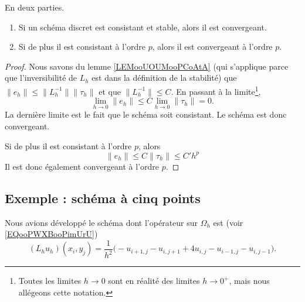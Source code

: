 \begin{theorem}     \label{THOooEPQQooUQMcgF}
    En deux parties.
    \begin{enumerate}
        \item
            Si un schéma discret est consistant et stable, alors il est convergeant. 
        \item
            Si de plus il est consistant à l'ordre \( p\), alors il est convergeant à l'ordre \( p\).
    \end{enumerate}
\end{theorem}

\begin{proof}
    Nous savons du lemme \ref{LEMooUOUMooPCoAtA} (qui s'applique parce que l'inversibilité de \( L_h\) est dans la définition de la stabilité) que  \( \| e_h \|\leq \| L_h^{-1} \| \| \tau_h \|\) et que  \( \| L_h^{-1} \|\leq C  \). En passant à la limite\footnote{Toutes les limites \( h\to 0\) sont en réalité des limites \( h\to 0^+\), mais nous allégeons cette notation.},
    \begin{equation}
        \lim_{h\to 0} \| e_h \|\leq C\lim_{h\to 0} \| \tau_h \|=0.
    \end{equation}
    La dernière limite est le fait que le schéma soit consistant. Le schéma est donc convergeant.

    Si de plus il est consistant à l'ordre \( p\), alors
    \begin{equation}
        \| e_h \|\leq C\| \tau_h \|\leq C'h^p
    \end{equation}
    Il est donc également convergeant à l'ordre \( p\).
\end{proof}

\subsection{Exemple : schéma à cinq points}

Nous avions développé le schéma dont l'opérateur sur \( \Omega_h\) est (voir \eqref{EQooPWXBooPimUrU}) 
\begin{equation}
    (L_hu_h)(x_i,y_j)=\frac{1}{ h^2 }\big( -u_{i+1,j}-u_{i,j+1} +4u_{i,j}-u_{i-1,j}-u_{i,j-1}  \big).
\end{equation}

